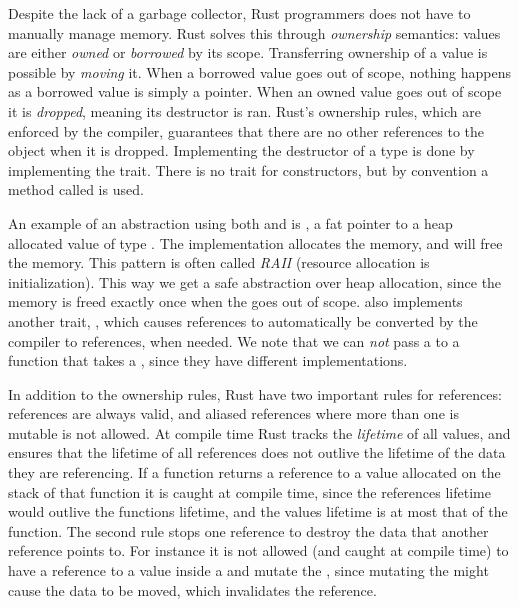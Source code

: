 \documentclass[b5paper]{report}
\begin{document}
Despite the lack of a garbage collector, Rust programmers does not have to
manually manage memory. Rust solves this through \emph{ownership} semantics:
values are either \emph{owned} or \emph{borrowed} by its scope. Transferring
ownership of a value is possible by \emph{moving} it. When a borrowed value goes
out of scope, nothing happens as a borrowed value is simply a pointer. When an
owned value goes out of scope it is \emph{dropped}, meaning its destructor is
ran. Rust's ownership rules, which are enforced by the compiler, guarantees that
there are no other references to the object when it is dropped. Implementing the
destructor of a type is done by implementing the  trait. There is no
trait for constructors, but by convention a method called  is used.

An example of an abstraction using both  and  is
, a fat pointer to a heap allocated value of type
. The  implementation allocates the memory, and 
will free the memory. This pattern is often called \emph{RAII} (resource
allocation is initialization). This way we get a safe abstraction over heap
allocation, since the memory is freed exactly once when the  goes out
of scope.   also implements another trait, , which
causes  references to automatically be converted by the compiler to
 references, when needed. We note that we can \emph{not} pass a
 to a function that takes a , since they have different
 implementations.

In addition to the ownership rules, Rust have two important rules for
references: references are always valid, and aliased references where more than
one is mutable is not allowed. At compile time Rust tracks the \emph{lifetime}
of all values, and ensures that the lifetime of all references does not outlive
the lifetime of the data they are referencing. If a function returns a reference
to a value allocated on the stack of that function it is caught at compile time,
since the references lifetime would outlive the functions lifetime, and the
values lifetime is at most that of the function. The second rule stops one
reference to destroy the data that another reference points to. For instance it
is not allowed (and caught at compile time) to have a reference to a value
inside a  and mutate the , since mutating the 
might cause the data to be moved, which invalidates the reference.
\end{document}

